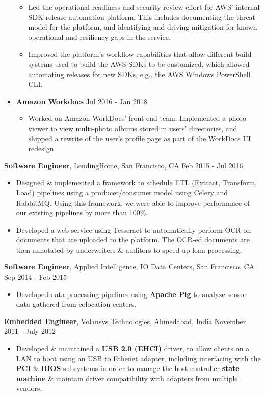 \documentclass[10pt, letterpaper]{article}
\begin{document}
\begin{itemize}
  \begin{itemize}[label=$\bullet$]
    \item Led the operational readiness and security review effort for AWS' internal SDK release automation platform. This includes documenting the threat model
      for the platform, and identifying and driving mitigation for known operational and resiliency gaps in the service. 
    \item Improved the platform's workflow capabilities that allow different build systems used to build the AWS SDKs to be customized, which allowed automating
      releases for new SDKs, e.g., the AWS Windows PowerShell CLI.
  \end{itemize}
\item \textbf{Amazon Workdocs} \hfill Jul 2016 - Jan 2018
  \begin{itemize}[label=$\bullet$]
    \item Worked on Amazon WorkDocs' front-end team. Implemented a photo viewer to view multi-photo albums stored in users' directories, and 
      shipped a rewrite of the user's profile page as part of the WorkDocs UI redesign.
  \end{itemize}
\end{itemize}
\textbf{Software Engineer}, LendingHome, San Francisco, CA \hfill Feb 2015 - Jul 2016
\begin{itemize}
\item Designed \& implemented a framework to schedule ETL (Extract, Transform, Load) pipelines using a producer/consumer model using Celery and RabbitMQ. 
  Using this framework, we were able to improve performance of our existing pipelines by more than 100\%.
\item Developed a web service using Tesseract to automatically perform OCR on documents that are uploaded to the platform. The OCR-ed documents are then annotated by underwriters \& auditors to speed up loan processing.
\end{itemize}
\textbf{Software Engineer}, Applied Intelligence, IO Data Centers, San Francisco, CA \hfill Sep 2014 - Feb 2015
\begin{itemize}
\item Developed data processing pipelines using \textbf{Apache Pig} to analyze sensor data gathered from colocation centers.
\end{itemize}
\textbf{Embedded Engineer}, Volansys Technologies, Ahmedabad, India \hfill November 2011 - July 2012
\begin{itemize}
\item Developed \& maintained a \textbf{USB 2.0 (EHCI)} driver, to allow clients on a LAN to boot using an USB to Ethenet adapter, including interfacing with the \textbf{PCI} \& \textbf{BIOS} subsystems in order to manage the host controller \textbf{state machine} \& maintain driver compatibility with adapters from multiple vendors. 
\end{itemize}
\end{document}
